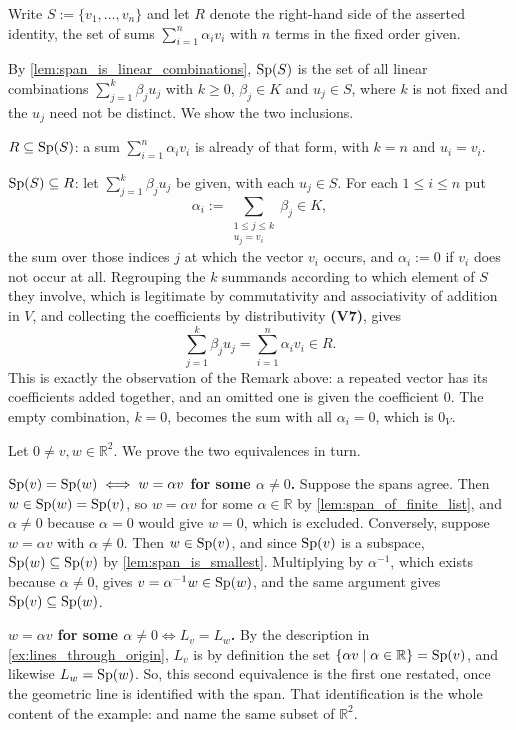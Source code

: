 \begin{exercisesolution}
\label{sol:span_of_finite_list}
Write $S := \{v_1, \dots, v_n\}$ and let $R$ denote the right-hand side of the asserted identity, the set of sums $\sum_{i=1}^n \alpha_i v_i$ with $n$ terms in the fixed order given.

By \cref{lem:span_is_linear_combinations}, $\operatorname{Sp}(S)$ is the set of all linear combinations $\sum_{j=1}^{k} \beta_j u_j$ with $k \ge 0$, $\beta_j \in K$ and $u_j \in S$, where $k$ is not fixed and the $u_j$ need not be distinct. We show the two inclusions.

$R \subseteq \operatorname{Sp}(S)$: a sum $\sum_{i=1}^n \alpha_i v_i$ is already of that form, with $k = n$ and $u_i = v_i$.

$\operatorname{Sp}(S) \subseteq R$: let $\sum_{j=1}^{k} \beta_j u_j$ be given, with each $u_j \in S$. For each $1 \le i \le n$ put
\[
    \alpha_i := \sum_{\substack{1 \le j \le k \\ u_j = v_i}} \beta_j \in K,
\]
the sum over those indices $j$ at which the vector $v_i$ occurs, and $\alpha_i := 0$ if $v_i$ does not occur at all. Regrouping the $k$ summands according to which element of $S$ they involve, which is legitimate by commutativity and associativity of addition in $V$, and collecting the coefficients by distributivity \textbf{(V7)}, gives
\[
    \sum_{j=1}^{k} \beta_j u_j = \sum_{i=1}^{n} \alpha_i v_i \in R.
\]
This is exactly the observation of the Remark above: a repeated vector has its coefficients added together, and an omitted one is given the coefficient $0$. The empty combination, $k = 0$, becomes the sum with all $\alpha_i = 0$, which is $0_V$.
\end{exercisesolution}

\begin{exercisesolution}
\label{sol:same_span_same_line}
Let $0 \ne v, w \in \mathbb{R}^2$. We prove the two equivalences in turn.

\textbf{$\operatorname{Sp}(v) = \operatorname{Sp}(w) \iff w = \alpha v$ for some $\alpha \ne 0$.} Suppose the spans agree. Then $w \in \operatorname{Sp}(w) = \operatorname{Sp}(v)$, so $w = \alpha v$ for some $\alpha \in \mathbb{R}$ by \cref{lem:span_of_finite_list}, and $\alpha \ne 0$ because $\alpha = 0$ would give $w = 0$, which is excluded. Conversely, suppose $w = \alpha v$ with $\alpha \ne 0$. Then $w \in \operatorname{Sp}(v)$, and since $\operatorname{Sp}(v)$ is a subspace, $\operatorname{Sp}(w) \subseteq \operatorname{Sp}(v)$ by \cref{lem:span_is_smallest}. Multiplying by $\alpha^{-1}$, which exists because $\alpha \ne 0$, gives $v = \alpha^{-1} w \in \operatorname{Sp}(w)$, and the same argument gives $\operatorname{Sp}(v) \subseteq \operatorname{Sp}(w)$.

\textbf{$w = \alpha v$ for some $\alpha \ne 0 \iff L_v = L_w$.} By the description in \cref{ex:lines_through_origin}, $L_v$ is by definition the set $\{\alpha v \mid \alpha \in \mathbb{R}\} = \operatorname{Sp}(v)$, and likewise $L_w = \operatorname{Sp}(w)$. So, this second equivalence is the first one restated, once the geometric line is identified with the span. That identification is the whole content of the example:  and  name the same subset of $\mathbb{R}^2$.
\end{exercisesolution}

